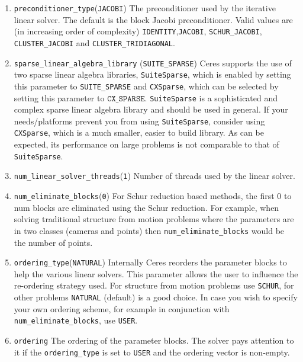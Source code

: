 \begin{enumerate}
\item{\texttt{preconditioner\_type}}(\texttt{JACOBI}) The preconditioner used by the iterative linear solver. The default is the block Jacobi preconditioner. Valid values are (in increasing order of complexity) \texttt{IDENTITY},\texttt{JACOBI}, \texttt{SCHUR\_JACOBI}, \texttt{CLUSTER\_JACOBI} and \texttt{CLUSTER\_TRIDIAGONAL}.

\item{\texttt{sparse\_linear\_algebra\_library} (\texttt{SUITE\_SPARSE})} Ceres supports the use of two sparse linear algebra libraries, \texttt{SuiteSparse}, which is enabled by setting this parameter to \texttt{SUITE\_SPARSE} and \texttt{CXSparse}, which can be selected by setting this parameter to $\texttt{CX\_SPARSE}$. \texttt{SuiteSparse} is a sophisticated and complex sparse linear algebra library and should be used in general. If your needs/platforms prevent you from using \texttt{SuiteSparse}, consider using \texttt{CXSparse}, which is a much smaller, easier to build library. As can be expected, its performance on large problems is not comparable to that of \texttt{SuiteSparse}.

\item{\texttt{num\_linear\_solver\_threads}}(\texttt{1}) Number of threads used by the linear solver. 

\item{\texttt{num\_eliminate\_blocks}}(\texttt{0}) 
For Schur reduction based methods, the first 0 to num blocks are
    eliminated using the Schur reduction. For example, when solving
     traditional structure from motion problems where the parameters are in
     two classes (cameras and points) then \texttt{num\_eliminate\_blocks} would be the
     number of points.

\item{\texttt{ordering\_type}}(\texttt{NATURAL})
 Internally Ceres reorders the parameter blocks to help the
 various linear solvers. This parameter allows the user to
     influence the re-ordering strategy used. For structure from
     motion problems use \texttt{SCHUR}, for other problems \texttt{NATURAL} (default)
     is a good choice. In case you wish to specify your own ordering
     scheme, for example in conjunction with \texttt{num\_eliminate\_blocks},
     use \texttt{USER}.

\item{\texttt{ordering}} The ordering of the parameter blocks. The solver pays attention
    to it if the \texttt{ordering\_type} is set to \texttt{USER} and the ordering vector is
    non-empty.


\end{enumerate}
